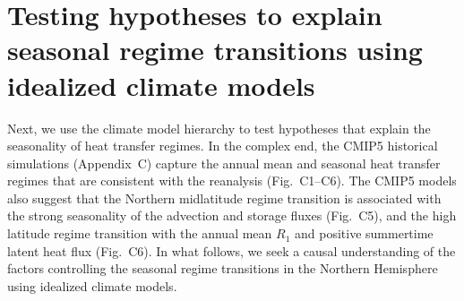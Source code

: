 \documentclass{ametsocV5}
\begin{document}
\section{Testing hypotheses to explain seasonal regime transitions using idealized climate models} \label{sec:hypo}
  Next, we use the climate model hierarchy to test hypotheses that explain the seasonality of heat transfer regimes. In the complex end, the CMIP5 historical simulations (Appendix~C) capture the annual mean and seasonal heat transfer regimes that are consistent with the reanalysis (Fig.~C1--C6). The CMIP5 models also suggest that the Northern midlatitude regime transition is associated with the strong seasonality of the advection and storage fluxes (Fig.~C5), and the high latitude regime transition with the annual mean $R_1$ and positive summertime latent heat flux (Fig.~C6). In what follows, we seek a causal understanding of the factors controlling the seasonal regime transitions in the Northern Hemisphere using idealized climate models.
\end{document}
